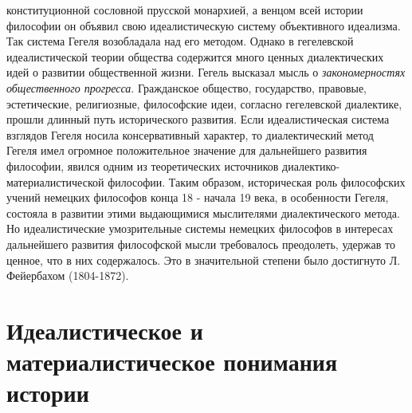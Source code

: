 \documentclass[12pt]{article}
\begin{document}
конституционной  сословной  прусской  монархией,  а  венцом  всей  истории  философии  он  объявил  свою
идеалистическую систему объективного идеализма.
Так система Гегеля возобладала над его методом. Однако в гегелевской идеалистической теории общества
содержится много ценных диалектических идей о развитии общественной жизни. Гегель высказал мысль о
\textit{закономерностях  общественного  прогресса}.  Гражданское  общество,  государство,  правовые,  эстетические,
религиозные,  философские  идеи,  согласно  гегелевской  диалектике,  прошли  длинный  путь  исторического
развития.
Если  идеалистическая  система  взглядов  Гегеля носила  консервативный  характер, то  диалектический метод
Гегеля  имел  огромное  положительное  значение  для  дальнейшего  развития  философии,  явился  одним  из
теоретических источников диалектико-материалистической философии.
Таким образом, историческая роль философских учений немецких философов конца 18 - начала 19 века, в
особенности  Гегеля,  состояла  в  развитии  этими  выдающимися  мыслителями  диалектического  метода.  Но
идеалистические  умозрительные  системы  немецких  философов  в  интересах  дальнейшего  развития
философской мысли требовалось преодолеть, удержав то ценное, что в них содержалось.
Это в значительной степени было достигнуто Л. Фейербахом (1804-1872).


\newpage
\section{Идеалистическое и материалистическое понимания истории}


\newpage
\end{document}

